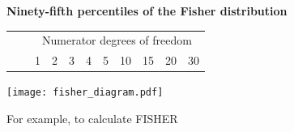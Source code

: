 \documentclass[a4paper]{article}
\begin{document}
\begin{center}
  {\Large\bf Ninety-fifth percentiles of the Fisher distribution}
\end{center}

\rule{0mm}{5mm}
\pagestyle{empty}
\thispagestyle{empty}
\begin{table}[ht]
\centering
\begin{tabular}{rr|ccccccccc}
  &&\multicolumn{9}{c}{Numerator degrees of freedom\rule[-4mm]{0mm}{4mm}}\\
  & & {\large 1} & {\large 2} & {\large 3} & {\large 4} & {\large 5} & {\large 10} &{\large 15} &{\large 20}& {\large 30}\\  \hline

  \hline
\end{tabular}
\end{table}

\begin{centering}
\texttt{[image: fisher\_diagram.pdf]}
\end{centering}

\noindent For example, to calculate {\large FISHER}
\\
\end{document}
